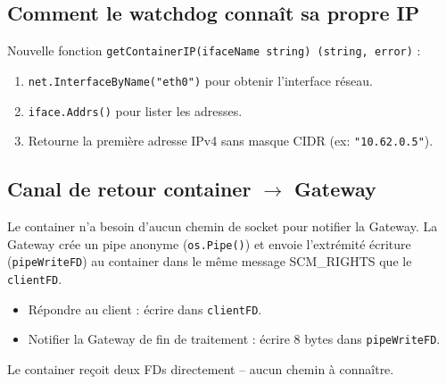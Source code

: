 \documentclass[11pt,a4paper]{article}
\begin{document}
\subsection{Comment le watchdog connaît sa propre IP}

Nouvelle fonction \texttt{getContainerIP(ifaceName string) (string, error)} :
\begin{enumerate}
  \item \texttt{net.InterfaceByName("eth0")} pour obtenir l'interface réseau.
  \item \texttt{iface.Addrs()} pour lister les adresses.
  \item Retourne la première adresse IPv4 sans masque CIDR (ex: \texttt{"10.62.0.5"}).
\end{enumerate}


\subsection{Canal de retour container $\to$ Gateway}

Le container n'a besoin d'aucun chemin de socket pour notifier la Gateway.
La Gateway crée un pipe anonyme (\texttt{os.Pipe()}) et envoie l'extrémité écriture
(\texttt{pipeWriteFD}) au container dans le même message SCM\_RIGHTS que le \texttt{clientFD}.
\begin{itemize}
  \item Répondre au client : écrire dans \texttt{clientFD}.
  \item Notifier la Gateway de fin de traitement : écrire 8 bytes dans \texttt{pipeWriteFD}.
\end{itemize}
Le container reçoit deux FDs directement -- aucun chemin à connaître.
\end{document}
